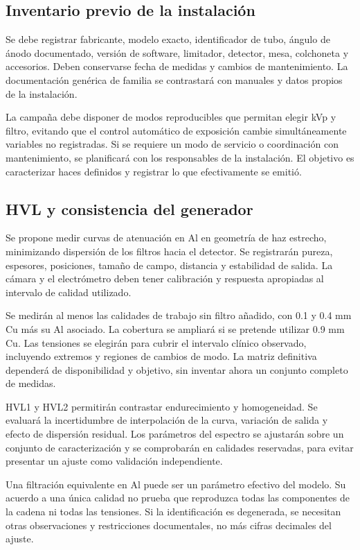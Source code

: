 \subsection{Inventario previo de la instalación}
Se debe registrar fabricante, modelo exacto, identificador de tubo, ángulo de ánodo documentado, versión de software, limitador, detector, mesa, colchoneta y accesorios. Deben conservarse fecha de medidas y cambios de mantenimiento. La documentación genérica de familia se contrastará con manuales y datos propios de la instalación.

La campaña debe disponer de modos reproducibles que permitan elegir kVp y filtro, evitando que el control automático de exposición cambie simultáneamente variables no registradas. Si se requiere un modo de servicio o coordinación con mantenimiento, se planificará con los responsables de la instalación. El objetivo es caracterizar haces definidos y registrar lo que efectivamente se emitió.

\subsection{HVL y consistencia del generador}
Se propone medir curvas de atenuación en Al en geometría de haz estrecho, minimizando dispersión de los filtros hacia el detector. Se registrarán pureza, espesores, posiciones, tamaño de campo, distancia y estabilidad de salida. La cámara y el electrómetro deben tener calibración y respuesta apropiadas al intervalo de calidad utilizado.

Se medirán al menos las calidades de trabajo sin filtro añadido, con \num{0.1} y \num{0.4} mm Cu más su Al asociado. La cobertura se ampliará si se pretende utilizar \num{0.9} mm Cu. Las tensiones se elegirán para cubrir el intervalo clínico observado, incluyendo extremos y regiones de cambios de modo. La matriz definitiva dependerá de disponibilidad y objetivo, sin inventar ahora un conjunto completo de medidas.

HVL1 y HVL2 permitirán contrastar endurecimiento y homogeneidad. Se evaluará la incertidumbre de interpolación de la curva, variación de salida y efecto de dispersión residual. Los parámetros del espectro se ajustarán sobre un conjunto de caracterización y se comprobarán en calidades reservadas, para evitar presentar un ajuste como validación independiente.

Una filtración equivalente en Al puede ser un parámetro efectivo del modelo. Su acuerdo a una única calidad no prueba que reproduzca todas las componentes de la cadena ni todas las tensiones. Si la identificación es degenerada, se necesitan otras observaciones y restricciones documentales, no más cifras decimales del ajuste.

